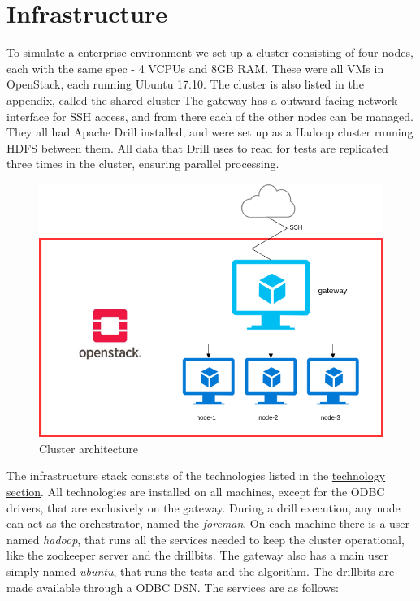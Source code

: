 \documentclass[a4paper,english]{report}
\begin{document}
		\section{Infrastructure}
			To simulate a enterprise environment we set up a cluster consisting of four nodes, each with the same spec - 4 VCPUs and 8GB RAM. These were all VMs in OpenStack, each running Ubuntu 17.10. The cluster is also listed in the appendix, called the \hyperref[table:cluster_shared]{shared cluster} The gateway has a outward-facing network interface for SSH access, and from there each of the other nodes can be managed. They all had Apache Drill installed, and were set up as a Hadoop cluster running HDFS between them. All data that Drill uses to read for tests are replicated three times in the cluster, ensuring parallel processing.
			\begin{figure}[H]
				\includegraphics[width=\textwidth]{cluster}
				\caption{Cluster architecture}
			\end{figure}
			The infrastructure stack consists of the technologies listed in the \hyperref[technology]{technology section}. All technologies are installed on all machines, except for the ODBC drivers, that are exclusively on the gateway. During a drill execution, any node can act as the orchestrator, named the \textit{foreman}. On each machine there is a user named \textit{hadoop}, that runs all the services needed to keep the cluster operational, like the zookeeper server and the drillbits. The gateway also has a main user simply named \textit{ubuntu}, that runs the tests and the algorithm. The drillbits are made available through a ODBC DSN.
			The services are as follows:
\end{document}
